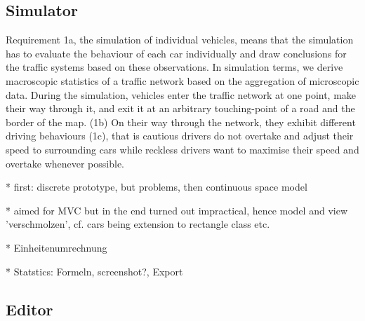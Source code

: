 \subsection{Simulator}
Requirement 1a, the simulation of individual vehicles, means that the simulation has to evaluate the behaviour of each car individually and draw conclusions for the traffic systems based on these observations. In simulation terms, we derive macroscopic statistics of a traffic network based on the aggregation of microscopic data.
During the simulation, vehicles enter the traffic network at one point, make their way through it, and exit it at an arbitrary touching-point of a road and the border of the map. (1b) On their way through the network, they exhibit different driving behaviours (1c), that is cautious drivers do not overtake and adjust their speed to surrounding cars while reckless drivers want to maximise their speed and overtake whenever possible.

\bigskip

* first: discrete prototype, but problems, then continuous space model

* aimed for MVC but in the end turned out impractical, hence model and view 'verschmolzen', cf. cars being extension to rectangle class etc.

* Einheitenumrechnung

* Statstics: Formeln, screenshot?, Export

\subsection{Editor}\label{ss_req_editor}
